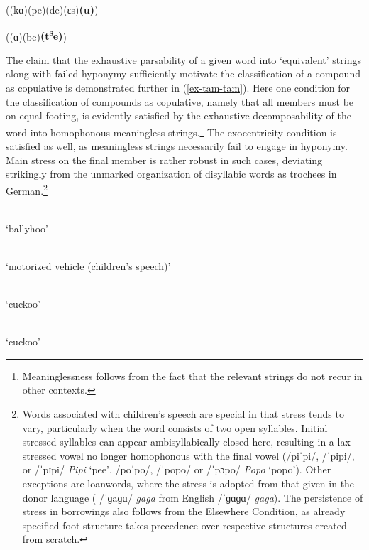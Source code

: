 \documentclass[output=paper
 ,nobabel
 ,draftmode
 ,colorlinks, citecolor=brown
]{langscibook}
\begin{document}
\ex ((kɑ)(pe)(de)(ɛs)\textbf{(u)})  		

\ex\label{ex-abc-head}
((ɑ)(be)\textbf{(t\textsuperscript{s}e)})  

\zl

\largerpage
\noindent
The claim that the exhaustive parsability of a given word into `equivalent' strings along with
failed hyponymy sufficiently motivate the classification of a compound as copulative is demonstrated
further in (\ref{ex-tam-tam}). Here one condition for the classification of compounds as copulative,
namely that all members must be on equal footing, is evidently satisfied by the exhaustive
decomposability of the word into homophonous meaningless strings.\footnote{Meaninglessness follows
  from the fact that the relevant strings do not recur in other contexts.} The exocentricity
condition is satisfied as well, as meaningless strings necessarily fail to engage in hyponymy. Main
stress on the final member is rather robust in such cases, deviating strikingly from the unmarked
organization of disyllabic words as trochees in German.\footnote{\label{fn-words-associated}Words
  associated with children's speech are special in that stress tends to vary, particularly when the
  word consists of two open syllables. Initial stressed syllables can appear ambisyllabically closed
  here, resulting in a lax stressed vowel no longer homophonous with the final vowel (\eg /piˈpi/,
  /ˈpipi/, or /ˈpɪpi/ \emph{Pipi} `pee', /poˈpo/, /ˈpopo/ or /ˈpɔpo/ \emph{Popo} `popo'). Other
  exceptions are loanwords, where the stress is adopted from that given in the donor language (\eg
  /ˈɡaɡɑ/ \emph{gaga} from English /ˈɡɑɡɑ/ \emph{gaga}). The persistence of stress in borrowings
  also follows from the Elsewhere Condition, as already specified foot structure takes precedence
  over respective structures created from scratch.}  

\eal\label{ex-tam-tam}

\ex {}\\
    `ballyhoo'

\ex {}\\
    `motorized vehicle (children's speech)'

\ex {}\\
    `cuckoo'

\ex {}\\
    `cuckoo'
\end{document}
